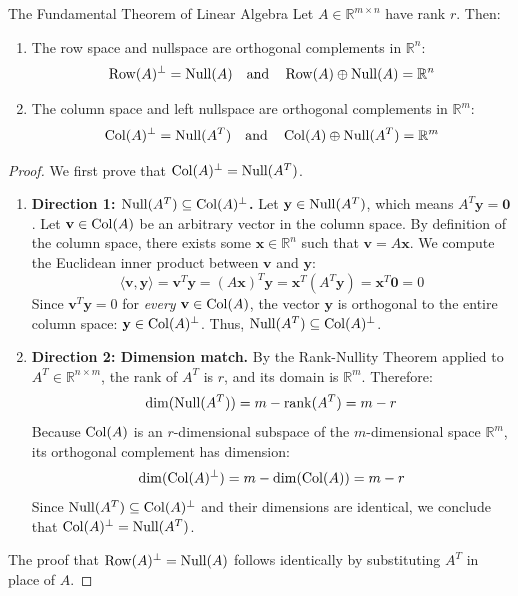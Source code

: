 \begin{theorembox}{The Fundamental Theorem of Linear Algebra}
Let $A \in \mathbb{R}^{m \times n}$ have rank $r$. Then:
\begin{enumerate}
    \item The row space and nullspace are orthogonal complements in $\mathbb{R}^n$:
    \begin{equation}
    \operatorname{Row}(A)^\perp = \operatorname{Null}(A) \quad \text{and} \quad \operatorname{Row}(A) \oplus \operatorname{Null}(A) = \mathbb{R}^n
    \label{eq:ftla_rn}
    \end{equation}
    \item The column space and left nullspace are orthogonal complements in $\mathbb{R}^m$:
    \begin{equation}
    \operatorname{Col}(A)^\perp = \operatorname{Null}(A^T) \quad \text{and} \quad \operatorname{Col}(A) \oplus \operatorname{Null}(A^T) = \mathbb{R}^m
    \label{eq:ftla_rm}
    \end{equation}
\end{enumerate}
\end{theorembox}

\begin{proof}
We first prove that $\operatorname{Col}(A)^\perp = \operatorname{Null}(A^T)$.
\begin{enumerate}
    \item \textbf{Direction 1: $\operatorname{Null}(A^T) \subseteq \operatorname{Col}(A)^\perp$.}
    Let $\mathbf{y} \in \operatorname{Null}(A^T)$, which means $A^T \mathbf{y} = \mathbf{0}$.
    Let $\mathbf{v} \in \operatorname{Col}(A)$ be an arbitrary vector in the column space. By definition of the column space, there exists some $\mathbf{x} \in \mathbb{R}^n$ such that $\mathbf{v} = A\mathbf{x}$.
    We compute the Euclidean inner product between $\mathbf{v}$ and $\mathbf{y}$:
    \begin{equation}
    \langle \mathbf{v}, \mathbf{y} \rangle = \mathbf{v}^T \mathbf{y} = (A\mathbf{x})^T \mathbf{y} = \mathbf{x}^T (A^T \mathbf{y}) = \mathbf{x}^T \mathbf{0} = 0
    \end{equation}
    Since $\mathbf{v}^T \mathbf{y} = 0$ for \emph{every} $\mathbf{v} \in \operatorname{Col}(A)$, the vector $\mathbf{y}$ is orthogonal to the entire column space: $\mathbf{y} \in \operatorname{Col}(A)^\perp$. Thus, $\operatorname{Null}(A^T) \subseteq \operatorname{Col}(A)^\perp$.

    \item \textbf{Direction 2: Dimension match.}
    By the Rank-Nullity Theorem applied to $A^T \in \mathbb{R}^{n \times m}$, the rank of $A^T$ is $r$, and its domain is $\mathbb{R}^m$. Therefore:
    \begin{equation}
    \dim(\operatorname{Null}(A^T)) = m - \operatorname{rank}(A^T) = m - r
    \end{equation}
    Because $\operatorname{Col}(A)$ is an $r$-dimensional subspace of the $m$-dimensional space $\mathbb{R}^m$, its orthogonal complement has dimension:
    \begin{equation}
    \dim(\operatorname{Col}(A)^\perp) = m - \dim(\operatorname{Col}(A)) = m - r
    \end{equation}
    Since $\operatorname{Null}(A^T) \subseteq \operatorname{Col}(A)^\perp$ and their dimensions are identical, we conclude that $\operatorname{Col}(A)^\perp = \operatorname{Null}(A^T)$.
\end{enumerate}
The proof that $\operatorname{Row}(A)^\perp = \operatorname{Null}(A)$ follows identically by substituting $A^T$ in place of $A$.
\end{proof}

